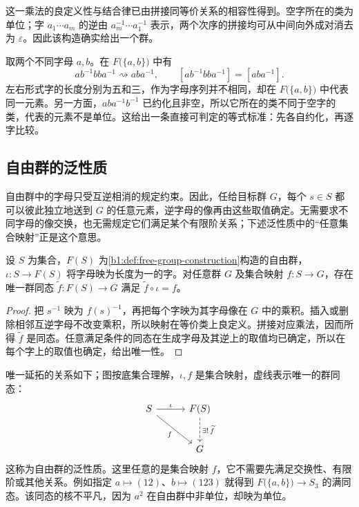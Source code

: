 这一乘法的良定义性与结合律已由拼接同等价关系的相容性得到。空字所在的类为单位；字 \(a_1\cdots a_m\) 的逆由 \(a_m^{-1}\cdots a_1^{-1}\) 表示，两个次序的拼接均可从中间向外成对消去为 \(\varepsilon\)。因此该构造确实给出一个群。

\ProseParagraphBreak
取两个不同字母 \(a,b\)。在 \(F\bigl(\{a,b\}\bigr)\) 中有
\[
	ab^{-1}bba^{-1}\rightsquigarrow aba^{-1},\qquad [ab^{-1}bba^{-1}]=[aba^{-1}].
\]
左右形式字的长度分别为五和三，作为字母序列并不相同，却在 \(F\bigl(\{a,b\}\bigr)\) 中代表同一元素。另一方面，\(aba^{-1}b^{-1}\) 已约化且非空，所以它所在的类不同于空字的类，代表的元素不是单位。这给出一条直接可判定的等式标准：先各自约化，再逐字比较。

\subsection{自由群的泛性质}
\label{b1:subsec:0801:02}

自由群中的字母只受互逆相消的规定约束。因此，任给目标群 \(G\)，每个 \(s\in S\) 都可以彼此独立地送到 \(G\) 的任意元素，逆字母的像再由这些取值确定。无需要求不同字母的像交换，也无需规定它们满足某个有限阶关系；下述泛性质中的“任意集合映射”正是这个意思。

\begin{theorem}\label{b1:thm:free-group-universal}
	设 \(S\) 为集合，\(F(S)\) 为\cref{b1:def:free-group-construction}构造的自由群，\(\iota:S\to F(S)\) 将字母映为长度为一的字。对任意群 \(G\) 及集合映射 \(f:S\to G\)，存在唯一群同态 \(\widetilde f:F(S)\to G\) 满足 \(\widetilde f\circ\iota=f\)。
\end{theorem}
\begin{proof}
	把 \(s^{-1}\) 映为 \(f(s)^{-1}\)，再把每个字映为其字母像在 \(G\) 中的乘积。插入或删除相邻互逆字母不改变乘积，所以映射在等价类上良定义。拼接对应乘法，因而所得 \(\widetilde f\) 是同态。任意满足条件的同态在生成字母及其逆上的取值均已确定，所以在每个字上的取值也确定，给出唯一性。
\end{proof}

唯一延拓的关系如下；图按底集合理解，\(\iota,f\) 是集合映射，虚线表示唯一的群同态：
\[
	\begin{tikzcd}[column sep=3em,row sep=2.5em]
		S\arrow[r,"\iota"]\arrow[dr,"f"']&F(S)\arrow[d,dashed,"\exists!\,\widetilde f"]\\
		&G
	\end{tikzcd}
\]
这称为自由群的泛性质。这里任意的是集合映射 \(f\)，它不需要先满足交换性、有限阶或其他关系。例如指定 \(a\mapsto(12)\)、\(b\mapsto(123)\) 就得到 \(F\bigl(\{a,b\}\bigr)\to S_3\) 的满同态。该同态的核不平凡，因为 \(a^2\) 在自由群中非单位，却映为单位。

